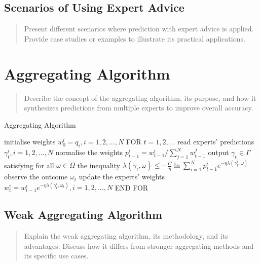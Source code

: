 \documentclass[11pt]{article} %
\theoremstyle{plain}
\theoremstyle{definition}
\begin{document}
\subsection{Scenarios of Using Expert Advice}
\begin{quote}
  Present different scenarios where prediction with expert advice is applied. Provide case studies or examples to illustrate its practical applications.
\end{quote}

\newpage

\section{Aggregating Algorithm}
\begin{quote}
  Describe the concept of the aggregating algorithm, its purpose, and how it synthesizes predictions from multiple experts to improve overall accuracy.
\end{quote}

\begin{algorithm}
  \caption{Aggregating Algorithm}\label{alg:cap}
  \begin{algorithmic}[1]
    \State initialise weights $w^i_0 = q_i, i = 1, 2, ..., N$
    \State FOR $t = 1, 2, ...$
    \State \hspace{\algorithmicindent} read experts' predictions $\gamma^i_t, i=1, 2, ..., N$
    \State \hspace{\algorithmicindent} normalise the weights $p^i_{t-1} = w^i_{t-1} / \sum^N_{j=1} w^j_{t-1}$
    \State \hspace{\algorithmicindent} output $\gamma_t \in \Gamma$ satisfying for all $\omega \in \Omega$ the inequality\newline\hspace*{\algorithmicindent}\hspace{\algorithmicindent} $\lambda(\gamma_t, \omega) \leq - \frac{C}{\eta} \ln \sum^N_{i=1}p^i_{t-1}e^{-\eta\lambda(\gamma^i_t, \omega)}$
    \State \hspace{\algorithmicindent} observe the outcome $\omega_t$
    \State \hspace{\algorithmicindent} update the experts' weights $w^i_t = w^i_{t-1} e^{-\eta \lambda(\gamma^i_t, \omega_t)}, i = 1, 2, ..., N$
    \State END FOR
  \end{algorithmic}
\end{algorithm}

\subsection{Weak Aggregating Algorithm}
\begin{quote}
  Explain the weak aggregating algorithm, its methodology, and its advantages. Discuss how it differs from stronger aggregating methods and its specific use cases.
\end{quote}
\end{document}

